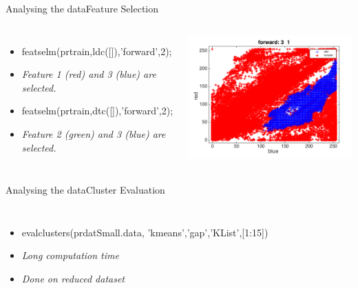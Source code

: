 \documentclass{beamer}
\begin{document}
\begin{frame}{Analysing the data}{Feature Selection}
    \begin{columns}
    \begin{itemize}
        \item featselm(prtrain,ldc([]),'forward',2);
        \item \emph{Feature 1 (red) and 3 (blue) are selected.}
        \item featselm(prtrain,dtc([]),'forward',2);
        \item \emph{Feature 2 (green) and 3 (blue) are selected.}
    \end{itemize}
        \includegraphics[scale=0.2]{featureselection.png}
    \end{columns}
\end{frame}

\begin{frame}{Analysing the data}{Cluster Evaluation}
    \begin{columns}
    \begin{itemize}
        \item evalclusters(prdatSmall.data,
        'kmeans','gap','KList',[1:15])
        \item \emph{Long computation time}
        \item \emph{Done on reduced dataset}
    \end{itemize}
        
    \end{columns}
\end{frame}
\end{document}
